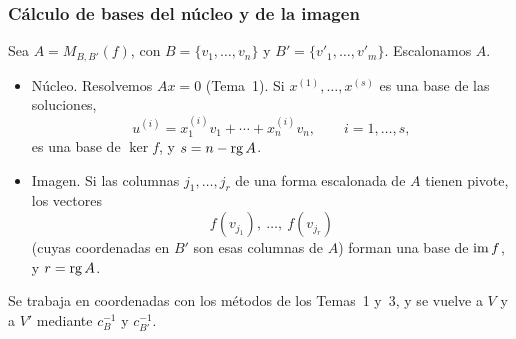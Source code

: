 \begin{frame}
    \frametitle{Cálculo de bases del núcleo y de la imagen}

    Sea $A=M_{B,B'}(f)$, con $B=\{v_1,\ldots,v_n\}$ y $B'=\{v'_1,\ldots,v'_m\}$.
    Escalonamos $A$.

    \begin{itemize}
        \item \alert{Núcleo.} Resolvemos $Ax=0$ (Tema~1). Si
        $x^{(1)},\ldots,x^{(s)}$ es una base de las soluciones,
        \[
            u^{(i)}=x^{(i)}_1v_1+\cdots+x^{(i)}_nv_n,
            \qquad i=1,\ldots,s,
        \]
        es una base de $\ker f$, y $s=n-\operatorname{rg} A$.
        \item \alert{Imagen.} Si las columnas $j_1,\ldots,j_r$ de una forma
        escalonada de $A$ tienen pivote, los vectores
        \[
            f(v_{j_1}),\ \ldots,\ f(v_{j_r})
        \]
        (cuyas coordenadas en $B'$ son esas columnas de $A$) forman una
        base de $\operatorname{im} f$, y $r=\operatorname{rg} A$.
    \end{itemize}

    \medskip

    Se trabaja en coordenadas con los métodos de los Temas~1 y~3, y se
    vuelve a $V$ y a $V'$ mediante $c_B^{-1}$ y $c_{B'}^{-1}$.
\end{frame}


